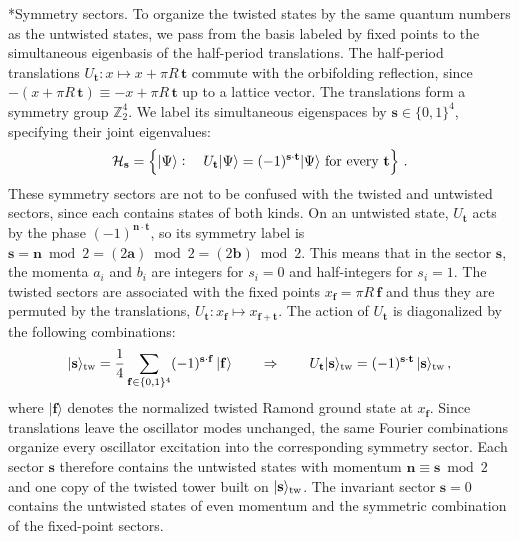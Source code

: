 \documentclass[aps,onecolumn,groupedaddress,nofootinbib,pra]{revtex4-2}
\makeatletter
\renewcommand\paragraph{\@startsection{paragraph}{4}{\parindent}{\z@}{-1em}{\normalfont\normalsize\bfseries}}
\newcommand{\bs}{\mathbf s}
\newcommand{\bt}{\mathbf t}
\newcommand{\bff}{\mathbf f}
\newcommand{\bn}{\mathbf n}
\newcommand{\ba}{\mathbf a}
\newcommand{\bb}{\mathbf b}
\makeatother
\begin{document}
\paragraph*{Symmetry sectors.}
To organize the twisted states by the same quantum numbers as the untwisted states, we pass from the basis labeled by fixed points to the simultaneous eigenbasis of the half-period translations. The half-period translations $U_\bt\colon x \mapsto x+\pi R\, \bt$ commute with the orbifolding reflection, since $-(x+\pi R\,\bt)\equiv-x+\pi R\,\bt$ up to a lattice vector. The translations form a symmetry group $\mathbb Z_2^4$. We label its simultaneous eigenspaces by $\bs\in\{0,1\}^4$, specifying their joint eigenvalues:
\begin{equation}
 {\cal H}_\bs = \left\{ |\Psi\rangle: \quad U_\bt |\Psi\rangle = (-1)^{\bs \cdot \bt} |\Psi \rangle \text{ for every } \bt \right\} \,.
\end{equation} 
These symmetry sectors are not to be confused with the twisted and untwisted sectors, since each contains states of both kinds. On an untwisted state, $U_\bt$ acts by the phase $(-1)^{\bn\cdot\bt}$, so its symmetry label is $\bs=\bn\bmod2=(2\ba)\bmod2=(2\bb)\bmod2$. This means that in the sector $\bs$, the momenta $a_i$ and $b_i$ are integers for $s_i=0$ and half-integers for $s_i=1$. The twisted sectors are associated with the fixed points $x_{\bff} = \pi R \, \bff$ and thus they are permuted by the translations, $U_{\bt} \colon x_{\bff} \mapsto x_{\bff + \bt}$. The action of $U_\bt$ is diagonalized by the following combinations:
\begin{equation}
\label{eq:twcomb}
|\bs\rangle_{\rm tw}=\frac14\sum_{\bff\in\{0,1\}^4}(-1)^{\bs\cdot\bff}\,|\bff\rangle 
\qquad \Rightarrow \qquad U_\bt   |\bs\rangle_{\rm tw} = (-1)^{\bs\cdot\bt}\,|\bs\rangle_{\rm tw} \,,
\end{equation}
where $|\bff\rangle$ denotes the normalized twisted Ramond ground state at $x_\bff$. Since translations leave the oscillator modes unchanged, the same Fourier combinations organize every oscillator excitation into the corresponding symmetry sector. Each sector $\bs$ therefore contains the untwisted states with momentum $\bn\equiv\bs\bmod2$ and one copy of the twisted tower built on $|\bs\rangle_{\rm tw}$. The invariant sector $\bs=0$ contains the untwisted states of even momentum and the symmetric combination of the fixed-point sectors.
\end{document}
